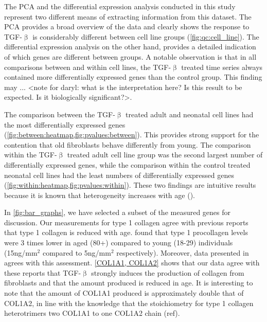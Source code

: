 \documentclass[alpha-refs]{wiley-article}
\newcommand{\tgf}{TGF-$\upbeta$}
\begin{document}
The PCA and the differential expression analysis conducted in this study represent two different means of extracting information from this dataset. The PCA provides a broad overview of the data and clearly shows the response to \tgf{} is considerably different between cell line groups (\cref{fig:qc:cell_line}). The differential expression analysis on the other hand, provides a detailed indication of which genes are different between groups. A notable observation is that in all comparisons between and within cell lines, the \tgf{} treated time series always contained more differentially expressed genes than the control group. This finding may ... <note for daryl: what is the interpretation here? Is this result to be expected. Is it biologically significant?>. 

The comparison between the \tgf{} treated adult and neonatal cell lines had the most differentially expressed genes (\cref{fig:between:heatmap,fig:pvalues:between}). This provides strong support for the contention that old fibroblasts behave differently from young. The comparison within the \tgf{} treated adult cell line group was the second largest number of differentially expressed genes, while the comparison within the control treated neonatal cell lines had the least numbers of differentially expressed genes (\cref{fig:within:heatmap,fig:pvalues:within}). These two findings are intuitive results because it is known that heterogeneity increases with age (\cite{Watt2011}). 

In \cref{fig:bar_graphs}, we have selected a subset of the measured genes for discussion. Our measurements for type 1 collagen agree with previous reports that type 1 collagen is reduced with age. \cite{Varani2006} found that type 1 procollagen levels were 3 times lower in aged (80+) compared to young (18-29) individuals (15ng/mm$^2$ compared to 5ng/mm$^2$ respectively). Moreover, data presented in \cite{Quan2010} agrees with this assessment. \cref{COL1A1, COL1A2} shows that our data agree with these reports that \tgf{} strongly induces the production of collagen from fibroblasts and that the amount produced is reduced in age. It is interesting to note that the amount of COL1A1 produced is approximately double that of COL1A2, in line with the knowledge that the stoichiometry for type 1 collagen heterotrimers two COL1A1 to one COL1A2 chain (ref). 
\end{document}
